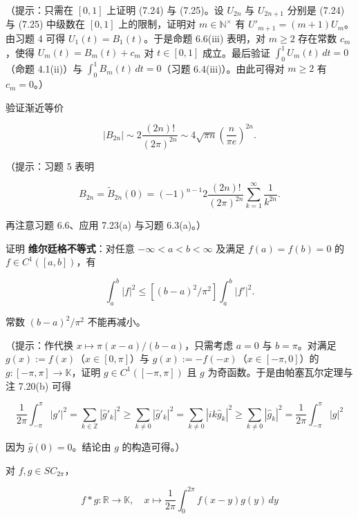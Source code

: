 \begin{exercises}
（提示：只需在 $ [0, 1] $ 上证明 (7.24) 与 (7.25)。设 $ U_{2n} $ 与 $ U_{2n+1} $ 分别是 (7.24) 与 (7.25) 中级数在 $ [0, 1] $ 上的限制，证明对 $ m \in \mathbb{N}^{\times} $ 有 $ U'_{m+1} = (m + 1)U_{m} $。由习题 4 可得 $ U_{1}(t) = B_{1}(t) $。于是命题 6.6(iii) 表明，对 $ m \ge 2 $ 存在常数 $ c_{m} $，使得 $ U_{m}(t) = B_{m}(t) + c_{m} $ 对 $ t \in [0, 1] $ 成立。最后验证 $ \int_{0}^{1} U_{m}(t)\, dt = 0 $（命题 4.1(ii)）与 $ \int_{0}^{1} B_{m}(t)\, dt = 0 $（习题 6.4(iii)）。由此可得对 $ m \ge 2 $ 有 $ c_{m} = 0 $。）

\item

验证渐近等价

\[
|B_{2n}| \sim 2\frac{(2n)!}{(2\pi)^{2n}} \sim 4\sqrt{\pi n}\left(\frac{n}{\pi e}\right)^{2n} .
\]

（提示：习题 5 表明

\[
B_{2n} = \widetilde{B}_{2n}(0) = (-1)^{n-1}2\frac{(2n)!}{(2\pi)^{2n}}\sum_{k=1}^{\infty}\frac{1}{k^{2n}} .
\]

再注意习题 6.6、应用 7.23(a) 与习题 6.3(a)。）

\item

证明 \textbf{维尔廷格不等式}：对任意 $ -\infty < a < b < \infty $ 及满足 $ f(a) = f(b) = 0 $ 的 $ f \in C^{1}([a, b]) $，有

\[
\int_{a}^{b}|f|^{2} \le [(b - a)^{2}/\pi^{2}]\int_{a}^{b}|f'|^{2} .
\]

常数 $ (b - a)^{2}/\pi^{2} $ 不能再减小。

（提示：作代换 $ x \mapsto \pi(x - a)/(b - a) $，只需考虑 $ a = 0 $ 与 $ b = \pi $。对满足 $ g(x) := f(x) $（$ x \in [0, \pi] $）与 $ g(x) := -f(-x) $（$ x \in [-\pi, 0] $）的 $ g : [-\pi, \pi] \to \mathbb{K} $，证明 $ g \in C^{1}([-\pi, \pi]) $ 且 $ g $ 为奇函数。于是由帕塞瓦尔定理与注 7.20(b) 可得

\[
\frac{1}{2\pi}\int_{-\pi}^{\pi}|g'|^{2} = \sum_{k \in \mathbb{Z}}|\widehat{g}'_{k}|^{2} \ge \sum_{k \ne 0}|\widehat{g}'_{k}|^{2} = \sum_{k \ne 0}|ik\widehat{g}_{k}|^{2} \ge \sum_{k \ne 0}|\widehat{g}_{k}|^{2} = \frac{1}{2\pi}\int_{-\pi}^{\pi}|g|^{2}
\]

因为 $ \widehat{g}(0) = 0 $。结论由 $ g $ 的构造可得。）

\item

对 $ f, g \in SC_{2\pi} $，

\[
f * g : \mathbb{R} \to \mathbb{K} , \quad x \mapsto \frac{1}{2\pi}\int_{0}^{2\pi} f(x - y)g(y)\, dy
\]


\end{exercises}
